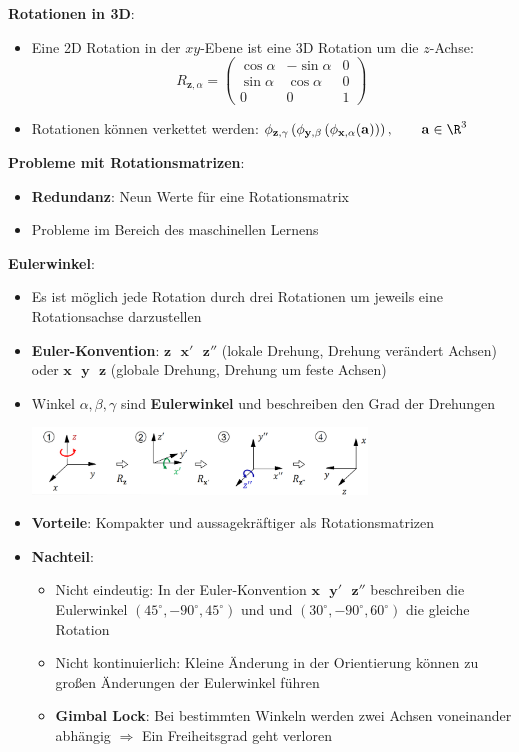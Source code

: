 \medskip
\textbf{Rotationen in 3D}:
\begin{itemize}
	\item Eine 2D Rotation in der $xy$-Ebene ist eine 3D Rotation um die $z$-Achse: $$R_{\mathbf{z},\alpha}=\left(\begin{matrix}
		\cos\alpha & -\sin\alpha & 0 \\
		\sin\alpha & \cos\alpha & 0 \\
		0 & 0 & 1
	\end{matrix}\right)$$
	\item Rotationen können verkettet werden: $\phi_{\mathbf{z},\gamma}\left(\phi_{\mathbf{y},\beta}\left(\phi_{\mathbf{x},\alpha}(\mathbf{a})\right)\right),\qquad \mathbf{a}\in\R^3$
\end{itemize}
\medskip
\textbf{Probleme mit Rotationsmatrizen}:
\begin{itemize}
	\item \textbf{Redundanz}: Neun Werte für eine Rotationsmatrix
	\item Probleme im Bereich des maschinellen Lernens
\end{itemize}
\pagebreak

\textbf{Eulerwinkel}:
\begin{itemize}
	\item Es ist möglich jede Rotation durch drei Rotationen um jeweils eine Rotationsachse darzustellen
	\item \textbf{Euler-Konvention}: $\mathbf{z}\text{ }\mathbf{x'}\text{ }\mathbf{z''}$ (lokale Drehung, Drehung verändert Achsen) oder $\mathbf{x}\text{ }\mathbf{y}\text{ }\mathbf{z}$ (globale Drehung, Drehung um feste Achsen)
	\item Winkel $\alpha,\beta,\gamma$ sind \textbf{Eulerwinkel} und beschreiben den Grad der Drehungen
	\begin{center}
		\includegraphics[width=0.7\textwidth]{images/euler.png}
	\end{center}
	\item \textbf{Vorteile}: Kompakter und aussagekräftiger als Rotationsmatrizen
	\item \textbf{Nachteil}: 
	\begin{itemize}
		\item Nicht eindeutig: In der Euler-Konvention $\mathbf{x}\text{ }\mathbf{y'}\text{ }\mathbf{z''}$ beschreiben die Eulerwinkel $(45^\circ,-90^\circ,45^\circ)$ und 
		und $(30^\circ,-90^\circ,60^\circ)$ die gleiche Rotation
		\item Nicht kontinuierlich: Kleine Änderung in der Orientierung können zu großen Änderungen der Eulerwinkel führen
		\item \textbf{Gimbal Lock}: Bei bestimmten Winkeln werden zwei Achsen voneinander abhängig $\Rightarrow$ Ein Freiheitsgrad geht verloren
	\end{itemize}
\end{itemize}
